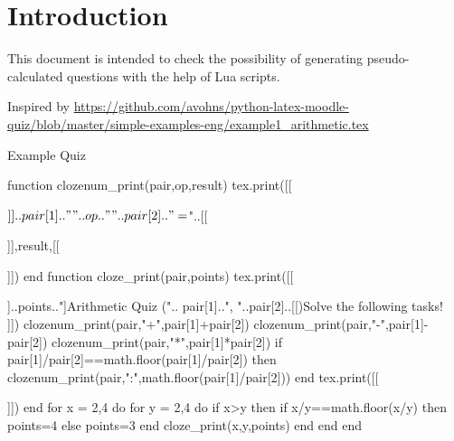 \documentclass{article}
\begin{document}
\section*{Introduction}

This document is intended to check the possibility of generating 
pseudo-calculated questions with the help of Lua scripts.

Inspired by
\url{https://github.com/avohns/python-latex-moodle-quiz/blob/master/simple-examples-eng/example1_arithmetic.tex}

\begin{quiz}[tags={calculated}]{Example Quiz}
\begin{luacode*}
function clozenum_print(pair,op,result)
  tex.print([[\begin{numerical}$]]..pair[1].." "..op.." "..pair[2]..
  " = $"..[[\item ]],result,[[\end{numerical}]])
end
function cloze_print(pair,points)
  tex.print([[\begin{cloze}[points=]]..points.."]{Arithmetic Quiz ("..
  pair[1]..", "..pair[2]..[[)}Solve the following tasks!\\]])
  clozenum_print(pair,"+",pair[1]+pair[2])
  clozenum_print(pair,"-",pair[1]-pair[2])
  clozenum_print(pair,"*",pair[1]*pair[2])
  if pair[1]/pair[2]==math.floor(pair[1]/pair[2]) then
    clozenum_print(pair,":",math.floor(pair[1]/pair[2]))
  end
  tex.print([[\end{cloze}]])
end
for x = 2,4 do
  for y = 2,4 do
    if x>y then
      if x/y==math.floor(x/y) then points=4 else points=3 end
      cloze_print({x,y},points)
    end
  end
end
\end{luacode*}
\end{quiz}
\end{document}
